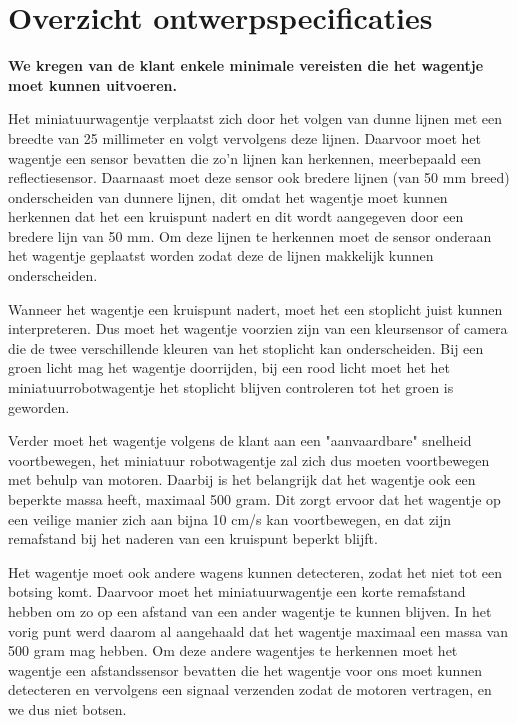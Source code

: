 \documentclass[12pt]{article}
\begin{document}
\section*{Overzicht ontwerpspecificaties}


	 

	\textbf{We kregen van de klant enkele minimale vereisten die het wagentje moet kunnen uitvoeren.}

	
		Het miniatuurwagentje verplaatst zich door het volgen van dunne lijnen met een breedte van 25 millimeter en volgt vervolgens deze lijnen. 
		Daarvoor moet het wagentje een sensor bevatten die zo'n lijnen kan herkennen, meerbepaald een reflectiesensor. 
		Daarnaast moet deze sensor ook bredere lijnen (van 50 mm breed) onderscheiden van dunnere lijnen, dit omdat het wagentje moet kunnen herkennen dat het een kruispunt nadert en dit wordt aangegeven door een bredere lijn van 50 mm.
		Om deze lijnen te herkennen moet de sensor onderaan het wagentje geplaatst worden zodat deze de lijnen makkelijk kunnen onderscheiden.
		
		
		Wanneer het wagentje een kruispunt nadert, moet het een stoplicht juist kunnen interpreteren.
		Dus moet het wagentje voorzien zijn van een kleursensor of camera die de twee verschillende kleuren van het stoplicht kan onderscheiden.
		Bij een groen licht mag het wagentje doorrijden, bij een rood licht moet het het miniatuurrobotwagentje het stoplicht blijven controleren tot het groen is geworden. 
		
		
		Verder moet het wagentje volgens de klant aan een "aanvaardbare" snelheid voortbewegen, het miniatuur robotwagentje zal zich dus moeten voortbewegen met behulp van motoren.
		Daarbij is het belangrijk dat het wagentje ook een beperkte massa heeft, maximaal 500 gram.
		Dit zorgt ervoor dat het wagentje op een veilige manier zich aan bijna 10 cm/s kan voortbewegen, en dat zijn remafstand bij het naderen van een kruispunt beperkt blijft.
		
		
		Het wagentje moet ook andere wagens kunnen detecteren, zodat het niet tot een botsing komt. Daarvoor moet het miniatuurwagentje een korte remafstand hebben om zo op een afstand van een ander wagentje te kunnen blijven.
		In het vorig punt werd daarom al aangehaald dat het wagentje maximaal een massa van 500 gram mag hebben. 
		Om deze andere wagentjes te herkennen moet het wagentje een afstandssensor bevatten die het wagentje voor ons moet kunnen detecteren en vervolgens een signaal verzenden zodat de motoren vertragen, en we dus niet botsen.
		
\end{document}
